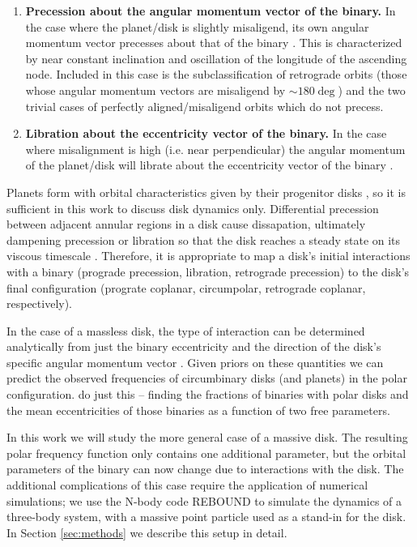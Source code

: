 \documentclass[twocolumn]{aastex631}
\begin{document}
\begin{enumerate}
    \item {\bf Precession about the angular momentum vector of the binary.} In the case where the planet/disk
        is slightly misaligend, its own angular momentum vector precesses about that of the binary \citep[e.g.,][]{bate2000,lubow2000}.
        This is characterized by near constant
        inclination and oscillation of the longitude of the ascending node. Included in this case is the subclassification
        of retrograde orbits (those whose angular momentum vectors are misaligend by $\sim 180 \deg$) and the two
        trivial cases of perfectly aligned/misaligend orbits which do not precess. \label{enum:precession}
    \item {\bf Libration about the eccentricity vector of the binary.} In the case where misalignment is high (i.e. near
    perpendicular) the angular momentum of the planet/disk will librate about the eccentricity vector of the binary 
    \citep[e.g.,][]{verrier2009,farago2010,doolin2011}.
    \label{enum:libration}
\end{enumerate}

Planets form with orbital characteristics given by their progenitor disks \citep[e.g.,][]{childs2021}, so it is sufficient in this work to
discuss disk dynamics only.
Differential precession between adjacent annular regions in a disk cause dissapation, ultimately dampening precession or libration
so that the disk reaches a steady state on its viscous timescale \citep[see also \citet{nixon2011,foucart2013,foucart2014}]{bate2000}. Therefore, it is appropriate to map a disk's
initial interactions with a binary (prograde precession, libration, retrograde precession) to the disk's final configuration
(prograte coplanar, circumpolar, retrograde coplanar, respectively).

In the case of a massless disk, the type of interaction can be determined analytically from just the binary eccentricity and the
direction of the disk's specific angular momentum vector
\citep[parameterized by the disk inclination and its longitude of the ascending node][]{zanazzi2018}.
Given priors on these quantities we can predict the observed frequencies of circumbinary disks (and planets) in the polar configuration.
\citet{ceppi2024} do just this -- finding the fractions of binaries with polar disks and the mean eccentricities of those binaries
as a function of two free parameters.

In this work we will study the more general case of a massive disk. The resulting polar frequency function only contains one
additional parameter, but the orbital parameters of the binary can now change due to interactions with the disk. The additional
complications of this case require the application of numerical simulations; we use the N-body code REBOUND \citep{rebound} to simulate the
dynamics of a three-body system, with a massive point particle used as a stand-in for the disk. In Section \ref{sec:methods}
we describe this setup in detail.
\end{document}
